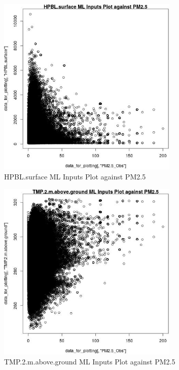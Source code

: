 \begin{figure} 
\centering  
\includegraphics[width=0.77\textwidth]{Code_Outputs/ML_input_report_ML_input_PM25_Step5_part_d_de_duplicated_aves_ML_input_HPBLsurfacevPM25_Obs.jpg} 
\caption{\label{fig:ML_input_report_ML_input_PM25_Step5_part_d_de_duplicated_aves_ML_inputHPBLsurfacevPM25_Obs}HPBL.surface ML Inputs Plot against PM2.5} 
\end{figure} 
 

\begin{figure} 
\centering  
\includegraphics[width=0.77\textwidth]{Code_Outputs/ML_input_report_ML_input_PM25_Step5_part_d_de_duplicated_aves_ML_input_TMP2mabovegroundvPM25_Obs.jpg} 
\caption{\label{fig:ML_input_report_ML_input_PM25_Step5_part_d_de_duplicated_aves_ML_inputTMP2mabovegroundvPM25_Obs}TMP.2.m.above.ground ML Inputs Plot against PM2.5} 
\end{figure} 
 

